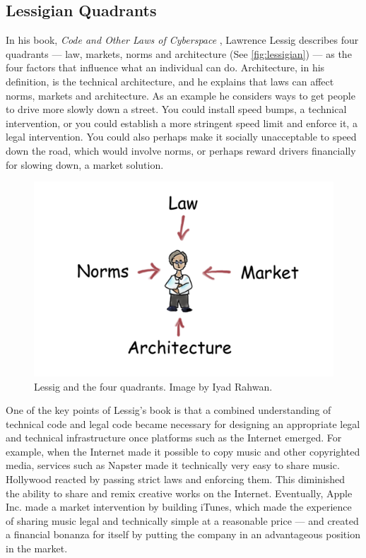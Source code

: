 \subsection{Lessigian Quadrants}
\label{sec:lessigq}

In his book, \emph{Code and Other Laws of Cyberspace} \cite{lessig2009code}, Lawrence Lessig describes four quadrants --- law, markets, norms and architecture (See \autoref{fig:lessigian}) --- as the four factors that influence what an individual can do. Architecture, in his definition, is the technical architecture, and he explains that laws can affect norms, markets and architecture. As an example he considers ways to get people to drive more slowly down a street. You could install speed bumps, a technical intervention, or you could establish a more stringent speed limit and enforce it, a legal intervention. You could also perhaps make it socially unacceptable to speed down the road, which would involve norms, or perhaps reward drivers financially for slowing down, a market solution. 

\begin{figure}[h]
 \centering
 \includegraphics[width=.5\textwidth]{pictures/lessig.jpg}
 \caption{Lessig and the four quadrants. Image by Iyad Rahwan.}
 \label{fig:lessigian}
\end{figure}

One of the key points of Lessig's book is that a combined understanding of technical code and legal code became necessary for designing an appropriate legal and technical infrastructure once platforms such as the Internet emerged. For example, when the Internet made it possible to copy music and other copyrighted media, services such as Napster made it technically very easy to share music. Hollywood reacted by passing strict laws and enforcing them. This diminished the ability to share and remix creative works on the Internet. Eventually, Apple Inc. made a market intervention by building iTunes, which made the experience of sharing music legal and technically simple at a reasonable price --- and created a financial bonanza for itself by putting the company in an advantageous position in the market.

